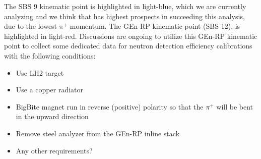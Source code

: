 The SBS 9 kinematic point is highlighted in light-blue, which we are currently analyzing and we think that has highest prospects in succeeding this analysis, due to the lowest $\pi^+$ momentum. The GEn-RP kinematic point (SBS 12), is highlighted in light-red. Discussions are ongoing to utilize this GEn-RP kinematic point to collect some dedicated data for neutron detection efficiency calibrations with the following conditions:
\begin{itemize}
    \item Use LH2 target
    \item Use a copper radiator
    \item BigBite magnet run in reverse (positive) polarity so that the $\pi^+$ will be bent in the upward direction
    \item Remove steel analyzer from the GEn-RP inline stack
    \item Any other requirements?
\end{itemize}


